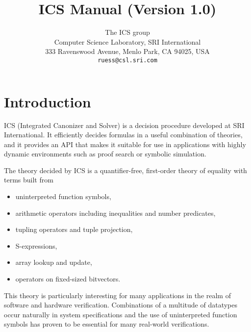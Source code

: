 \documentclass[12pt]{article}
\title{ICS Manual (Version 1.0)}
\author{The ICS group\\[0.3em]
  {\small Computer Science Laboratory, SRI International} \\[-0.2em]
  {\small 333 Ravenswood Avenue, Menlo Park, CA 94025, USA} \\[-0.2em]
  {\small\texttt{ruess@csl.sri.com}}}
\date{}
\begin{document}
\maketitle
\tableofcontents

\section{Introduction}\label{sec:intro}

ICS (Integrated Canonizer and Solver) is a
decision procedure developed at SRI International.
It efficiently decides formulas in a useful combination
of theories, and it provides an API that makes
it suitable for use in applications with highly dynamic
environments such as proof search or symbolic simulation.

The theory decided by ICS is a quantifier-free,
first-order theory of equality with terms built from
  \begin{itemize}
  \item uninterpreted function symbols,
  \item arithmetic operators including inequalities and number predicates,
  \item tupling operators and tuple projection,
  \item S-expressions,
  \item array lookup and update,
  \item operators on fixed-sized bitvectors.
  \end{itemize}
This theory is particularly interesting for many applications in the realm
of software and hardware verification.  Combinations of a multitude
of datatypes occur naturally in system specifications and the use of
uninterpreted function symbols has proven to be essential
for many real-world verifications.
\end{document}
